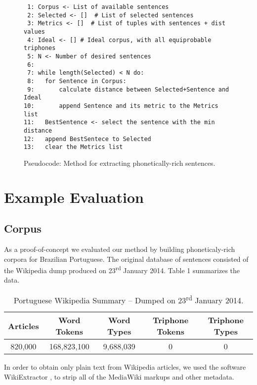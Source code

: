 \begin{figure}
\scriptsize
\caption{Pseudocode: Method for extracting phonetically-rich sentences.}\label{fig:phon-rich-pseudocode}
\begin{lstlisting}
 1: Corpus <- List of available sentences
 2: Selected <- []  # List of selected sentences
 3: Metrics <- []  # List of tuples with sentences + dist values
 4: Ideal <- [] # Ideal corpus, with all equiprobable triphones
 5: N <- Number of desired sentences
 6: 
 7: while length(Selected) < N do:
 8:   for Sentence in Corpus:
 9:       calculate distance between Selected+Sentence and Ideal
10:       append Sentence and its metric to the Metrics list
11:   BestSentence <- select the sentence with the min distance
12:   append BestSentece to Selected
13:   clear the Metrics list
\end{lstlisting}
\end{figure}


\section{Example Evaluation}
\subsection{Corpus}

As a proof-of-concept we evaluated our method by building phoneticaly-rich corpora for Brazilian Portuguese. The original 
database of sentences consisted of the Wikipedia dump produced on 23\textsuperscript{rd} January 2014.
Table 1 summarizes the data.

\begin{table}[H]
\begin{center}
\begin{tabular}{|c|c|c|c|c|}
\hline \bf Articles & \bf Word Tokens  & \bf Word Types & \bf Triphone Tokens & \bf Triphone Types\\\hline
820,000 & 168,823,100 & 9,688,039 & 0 & 0\\
\hline
\end{tabular}
\end{center}
\caption{\label{wikipedia-summary} Portuguese Wikipedia Summary -- Dumped on 23\textsuperscript{rd} January 2014.}
\end{table}

In order to obtain only plain text from Wikipedia articles, we used the software WikiExtractor \cite{Wikiextractor2013}, to strip 
all of the MediaWiki markups and other metadata. 

